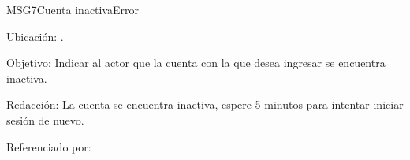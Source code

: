 \begin{mensaje}{MSG7}{Cuenta inactiva}{Error}
	\item[Ubicación:] \msjEmergente.
	\item[Objetivo:] Indicar al actor que la cuenta con la que desea ingresar se encuentra inactiva.
	\item[Redacción:] La cuenta se encuentra inactiva, espere 5 minutos para intentar iniciar sesión de nuevo.
	\item[Referenciado por:] 
\end{mensaje}

%
%
%
%	
%	
%
%
